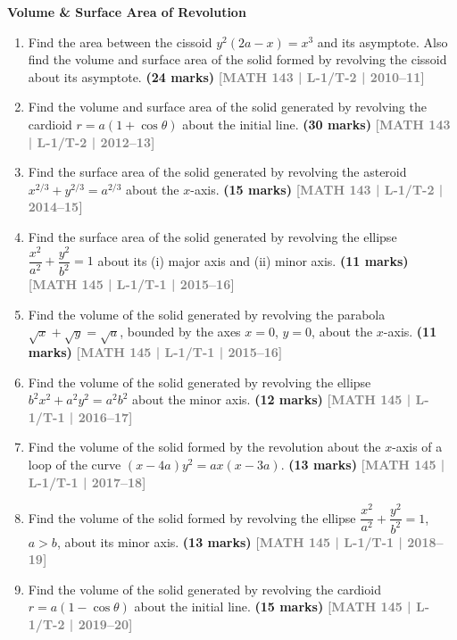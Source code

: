 \documentclass[12pt,a4paper]{article}
\newcommand{\yr}[1]{\hfill\textcolor{gray}{\small\textbf{[#1]}}}
\newcommand{\mk}[1]{\textcolor{orange!70!black}{\small\textbf{(#1 marks)}}}
\newcommand{\subtopic}[2]{%
  \vspace{10pt}
  \noindent\begin{tcolorbox}[colback=#1!8,colframe=#1,boxrule=0.6pt,arc=4pt,
    left=6pt,right=6pt,top=4pt,bottom=4pt]
    \small\bfseries\textcolor{#1}{#2}
  \end{tcolorbox}
  \vspace{2pt}
}
\begin{document}
\subtopic{cB}{Volume \& Surface Area of Revolution}
\label{sub:s2-volume}

\begin{enumerate}

\item Find the area between the cissoid $y^{2}(2a-x)=x^{3}$ and its asymptote. Also find the volume and surface area of the solid formed by revolving the cissoid about its asymptote.
\mk{24\textonehalf} \yr{MATH 143 | L-1/T-2 | 2010--11}

\item Find the volume and surface area of the solid generated by revolving the cardioid $r=a(1+\cos\theta)$ about the initial line.
\mk{30\textonehalf} \yr{MATH 143 | L-1/T-2 | 2012--13}

\item Find the surface area of the solid generated by revolving the asteroid $x^{2/3}+y^{2/3}=a^{2/3}$ about the $x$-axis.
\mk{15} \yr{MATH 143 | L-1/T-2 | 2014--15}

\item Find the surface area of the solid generated by revolving the ellipse $\dfrac{x^{2}}{a^{2}}+\dfrac{y^{2}}{b^{2}}=1$ about its (i) major axis and (ii) minor axis.
\mk{11} \yr{MATH 145 | L-1/T-1 | 2015--16}

\item Find the volume of the solid generated by revolving the parabola $\sqrt{x}+\sqrt{y}=\sqrt{a}$, bounded by the axes $x=0$, $y=0$, about the $x$-axis.
\mk{11} \yr{MATH 145 | L-1/T-1 | 2015--16}

\item Find the volume of the solid generated by revolving the ellipse $b^{2}x^{2}+a^{2}y^{2}=a^{2}b^{2}$ about the minor axis.
\mk{12} \yr{MATH 145 | L-1/T-1 | 2016--17}

\item Find the volume of the solid formed by the revolution about the $x$-axis of a loop of the curve $(x-4a)y^{2}=ax(x-3a)$.
\mk{13} \yr{MATH 145 | L-1/T-1 | 2017--18}

\item Find the volume of the solid formed by revolving the ellipse $\dfrac{x^{2}}{a^{2}}+\dfrac{y^{2}}{b^{2}}=1$, $a>b$, about its minor axis.
\mk{13} \yr{MATH 145 | L-1/T-1 | 2018--19}

\item Find the volume of the solid generated by revolving the cardioid $r=a(1-\cos\theta)$ about the initial line.
\mk{15} \yr{MATH 145 | L-1/T-2 | 2019--20}


\end{enumerate}
\end{document}
